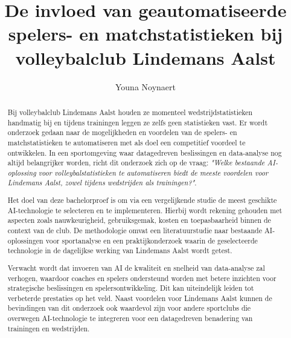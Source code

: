 \documentclass{hogent-article}
\title{De invloed van geautomatiseerde spelers- en matchstatistieken bij volleybalclub Lindemans Aalst}
\author{Youna Noynaert}
\begin{document}
  \begin{abstract}
    Bij volleybalclub Lindemans Aalst houden ze momenteel wedstrijdstatistieken handmatig bij en tijdens trainingen leggen ze zelfs geen statistieken vast. Er wordt onderzoek gedaan naar de mogelijkheden en voordelen van de spelers- en matchstatistieken te automatiseren met als doel een competitief voordeel te ontwikkelen. In een sportomgeving waar datagedreven beslissingen en data-analyse nog altijd belangrijker worden, richt dit onderzoek zich op de vraag: \textit{"Welke bestaande AI-oplossing voor volleybalstatistieken te automatiseren biedt de meeste voordelen voor Lindemans Aalst, zowel tijdens wedstrijden als trainingen?"}.
  
    Het doel van deze bachelorproef is om via een vergelijkende studie de meest geschikte AI-technologie te selecteren en te implementeren. Hierbij wordt rekening gehouden met aspecten zoals nauwkeurigheid, gebruiksgemak, kosten en toepasbaarheid binnen de context van de club. De methodologie omvat een literatuurstudie naar bestaande AI-oplossingen voor sportanalyse en een praktijkonderzoek waarin de geselecteerde technologie in de dagelijkse werking van Lindemans Aalst wordt getest.
  
    Verwacht wordt dat invoeren van AI de kwaliteit en snelheid van data-analyse zal verhogen, waardoor coaches en spelers ondersteund worden met betere inzichten voor strategische beslissingen en spelersontwikkeling. Dit kan uiteindelijk leiden tot verbeterde prestaties op het veld. Naast voordelen voor Lindemans Aalst kunnen de bevindingen van dit onderzoek ook waardevol zijn voor andere sportclubs die overwegen AI-technologie te integreren voor een datagedreven benadering van trainingen en wedstrijden. 
  \end{abstract}

  \tableofcontents

  \listoffigures

  
  
  \printbibliography[heading=bibintoc]
\end{document}
